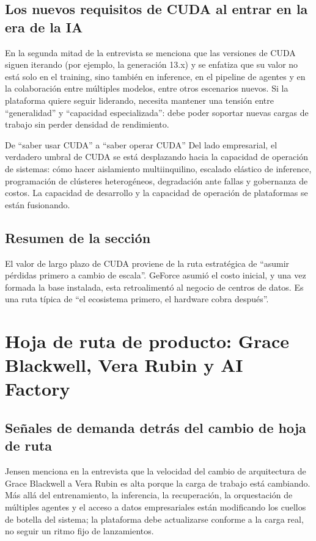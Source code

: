 \documentclass[a4paper]{article}
\begin{document}
\subsection{Los nuevos requisitos de CUDA al entrar en la era de la IA}

En la segunda mitad de la entrevista se menciona que las versiones de CUDA siguen iterando (por ejemplo, la generación 13.x) y se enfatiza que su valor no está solo en el training, sino también en inference, en el pipeline de agentes y en la colaboración entre múltiples modelos, entre otros escenarios nuevos. Si la plataforma quiere seguir liderando, necesita mantener una tensión entre ``generalidad'' y ``capacidad especializada'': debe poder soportar nuevas cargas de trabajo sin perder densidad de rendimiento.

\begin{knowledgebox}{De ``saber usar CUDA'' a ``saber operar CUDA''}
Del lado empresarial, el verdadero umbral de CUDA se está desplazando hacia la capacidad de operación de sistemas: cómo hacer aislamiento multiinquilino, escalado elástico de inference, programación de clústeres heterogéneos, degradación ante fallas y gobernanza de costos. La capacidad de desarrollo y la capacidad de operación de plataformas se están fusionando.
\end{knowledgebox}

\subsection{Resumen de la sección}

El valor de largo plazo de CUDA proviene de la ruta estratégica de ``asumir pérdidas primero a cambio de escala''. GeForce asumió el costo inicial, y una vez formada la base instalada, esta retroalimentó al negocio de centros de datos. Es una ruta típica de ``el ecosistema primero, el hardware cobra después''.
\section{Hoja de ruta de producto: Grace Blackwell, Vera Rubin y AI Factory}

\subsection{Señales de demanda detrás del cambio de hoja de ruta}

Jensen menciona en la entrevista que la velocidad del cambio de arquitectura de Grace Blackwell a Vera Rubin es alta porque la carga de trabajo está cambiando. Más allá del entrenamiento, la inferencia, la recuperación, la orquestación de múltiples agentes y el acceso a datos empresariales están modificando los cuellos de botella del sistema; la plataforma debe actualizarse conforme a la carga real, no seguir un ritmo fijo de lanzamientos.
\end{document}
